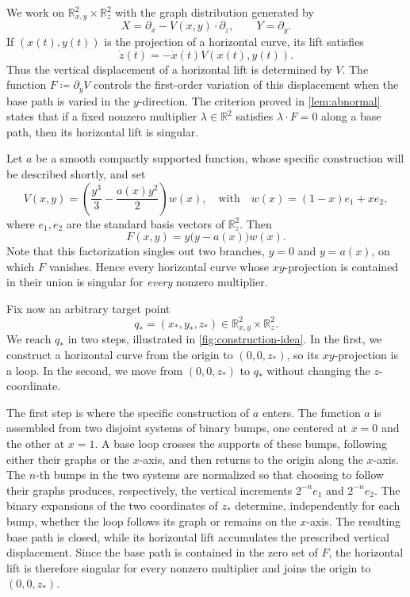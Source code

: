 \documentclass[11pt]{amsart}
\numberwithin{equation}{section}
\theoremstyle{remark}
\newcommand{\R}{\mathbb R}
\begin{document}
We work on $\R^2_{x,y}\times\R^2_z$ with the graph distribution generated
by
\begin{equation}
X=\partial_x-V(x,y)\cdot\partial_z,
\qquad
Y=\partial_y .
\end{equation}
If $(x(t),y(t))$ is the projection of a horizontal curve, its lift
satisfies
\begin{equation}
\dot z(t)=-\dot x(t)V(x(t),y(t)).
\end{equation}
Thus the vertical displacement of a horizontal lift is determined by
$V$. The function $F\coloneq\partial_yV$ 
controls the first-order variation of this displacement when the base
path is varied in the $y$-direction. The criterion proved in
\cref{lem:abnormal} states that if a fixed nonzero multiplier
$\lambda\in\R^2$ satisfies $\lambda\cdot F=0$ along a base path, then
its horizontal lift is singular.

Let $a$ be a smooth compactly supported function, whose specific
construction will be described shortly, and set
\begin{equation}
V(x,y) = \left(\frac{y^3}{3}-\frac{a(x)y^2}{2}\right)w(x), \quad \text{with} \quad  w(x) =(1-x)e_1+xe_2,
\end{equation}
where $e_1,e_2$ are the standard basis vectors of $\R^2_z$. Then
\begin{equation}
F(x,y)=y\bigl(y-a(x)\bigr)w(x).
\end{equation}
Note that this factorization singles out two branches, $y=0$ and $y=a(x)$, on
which $F$ vanishes. Hence every horizontal curve whose $xy$-projection
is contained in their union is singular for \emph{every} nonzero multiplier. 

Fix now an arbitrary target point
\begin{equation}
q_*=(x_*,y_*,z_*)\in\R^2_{x,y}\times\R^2_z .
\end{equation}
We reach $q_*$ in two steps,  illustrated in \cref{fig:construction-idea}. In the first, we construct a horizontal
curve from the origin to $(0,0,z_*)$, so its  $xy$-projection is a loop.
In the second, we move from $(0,0,z_*)$ to $q_*$ without changing the
$z$-coordinate. 

The first step is where the specific construction of $a$ enters. The function
$a$ is assembled from two disjoint systems of binary bumps, one
centered at $x=0$ and the other at $x=1$. A base loop crosses the
supports of these bumps, following either their graphs or the
$x$-axis, and then returns to the origin along the $x$-axis. The
$n$-th bumps in the two systems are normalized so that choosing to
follow their graphs produces, respectively, the vertical increments
$2^{-n}e_1$ and $2^{-n}e_2$. The binary expansions of the two coordinates of $z_*$ determine,
independently for each bump, whether the loop follows its graph or
remains on the $x$-axis. The resulting base path is closed, while its
horizontal lift accumulates the prescribed vertical displacement. Since the base path is contained in the zero set of $F$, the horizontal lift is therefore
singular for every nonzero multiplier and joins the origin to
$(0,0,z_*)$. 
\end{document}
